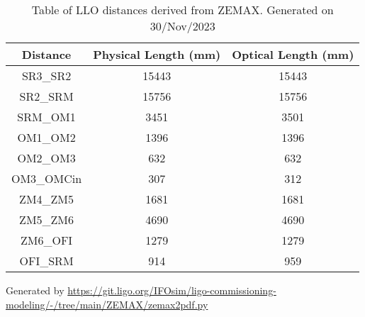 \documentclass{article}
\begin{document}
\begin{table}[h!] 
\centering  
\begin{tabular}{| c| c | c |} 
\hline \bf{Distance} & \bf{Physical Length (mm)} & \bf{Optical Length (mm)} \\ \hline 
SR3\_SR2 & 15443 & 15443 \\ 
SR2\_SRM & 15756 & 15756 \\ 
SRM\_OM1 & 3451 & 3501 \\ 
OM1\_OM2 & 1396 & 1396 \\ 
OM2\_OM3 & 632 & 632 \\ 
OM3\_OMCin & 307 & 312 \\ 
ZM4\_ZM5 & 1681 & 1681 \\ 
ZM5\_ZM6 & 4690 & 4690 \\ 
ZM6\_OFI & 1279 & 1279 \\ 
OFI\_SRM & 914 & 959 \\ 
\hline 
\end{tabular} 
\caption{Table of LLO distances derived from ZEMAX. Generated on 30/Nov/2023}
\end{table} 


 Generated by \url{https://git.ligo.org/IFOsim/ligo-commissioning-modeling/-/tree/main/ZEMAX/zemax2pdf.py}
\end{document}
